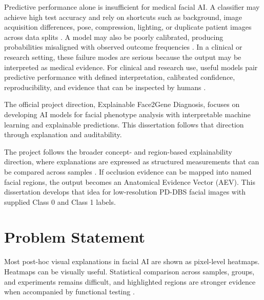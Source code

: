 Predictive performance alone is insufficient for medical facial AI. A classifier may achieve high test accuracy and rely on shortcuts such as background, image acquisition differences, pose, compression, lighting, or duplicate patient images across data splits     . A model may also be poorly calibrated, producing probabilities misaligned with observed outcome frequencies   . In a clinical or research setting, these failure modes are serious because the output may be interpreted as medical evidence. For clinical and research use, useful models pair predictive performance with defined interpretation, calibrated confidence, reproducibility, and evidence that can be inspected by humans      .


The official project direction, Explainable Face2Gene Diagnosis, focuses on developing AI models for facial phenotype analysis with interpretable machine learning and explainable predictions. This dissertation follows that direction through explanation and auditability.


The project follows the broader concept- and region-based explainability direction, where explanations are expressed as structured measurements that can be compared across samples   . If occlusion evidence can be mapped into named facial regions, the output becomes an Anatomical Evidence Vector (AEV). This dissertation develops that idea for low-resolution PD-DBS facial images with supplied Class 0 and Class 1 labels.


\section{Problem Statement}

Most post-hoc visual explanations in facial AI are shown as pixel-level heatmaps. Heatmaps can be visually useful. Statistical comparison across samples, groups, and experiments remains difficult, and highlighted regions are stronger evidence when accompanied by functional testing    .



